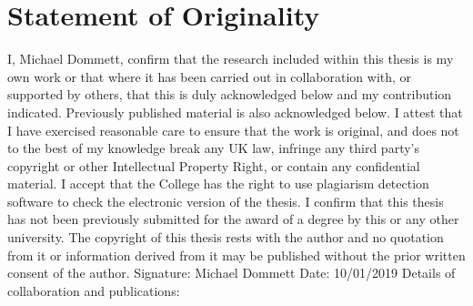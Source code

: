 \chapter*{Statement of Originality}
I, Michael Dommett, confirm that the research included within this thesis is my own work or that where it has been carried out in collaboration with, or supported by others, that this is duly acknowledged below and my contribution indicated. Previously published material is also acknowledged below.
\newline
\newline
\noindent{} I attest that I have exercised reasonable care to ensure that the work is original, and does not to the best of my knowledge break any UK law, infringe any third party's copyright or other Intellectual Property Right, or contain any confidential material.
\newline
\newline
\noindent{} I accept that the College has the right to use plagiarism detection software to check the electronic version of the thesis.
\newline
\newline
\noindent{} I confirm that this thesis has not been previously submitted for the award of a degree by this or any other university.
\newline
\newline
\noindent{}The copyright of this thesis rests with the author and no quotation from it or information derived from it may be published without the prior written consent of the author.
\newline
\newline
Signature: Michael Dommett 
\newline
Date: 10/01/2019
\newline
\newline
Details of collaboration and publications:
